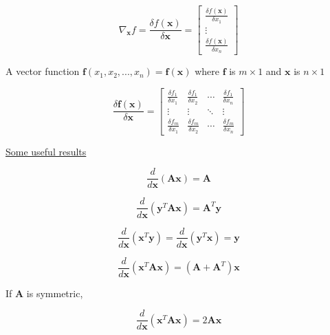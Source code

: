 \documentclass[fleqn]{article}
\begin{document}
	\begin{equation*}
		\nabla_{\mathbf{x}}f = \frac{\delta f(\mathbf{x})}{\delta\mathbf{x}} = \begin{bmatrix}
			\frac{\delta f(\mathbf{x})}{\delta{x_1}} \\
			\vdots \\
			\frac{\delta f(\mathbf{x})}{\delta{x_n}}
		\end{bmatrix}
	\end{equation*}
	
	A vector function $\mathbf{f}(x_1,x_2,...,x_n) = \mathbf{f}(\mathbf{x})$ where $\mathbf{f}$ is $m \times 1$ and $\mathbf{x}$ is $n \times 1$
	
	\begin{equation*}
		\frac{\delta\mathbf{f}(\mathbf{x})}{\delta\mathbf{x}} = \begin{bmatrix}
			\frac{\delta{f_1}}{\delta{x_1}} & \frac{\delta{f_1}}{\delta{x_2}} & \cdots & \frac{\delta{f_1}}{\delta{x_n}} \\
			\vdots & \vdots & \ddots & \vdots \\
			\frac{\delta{f_m}}{\delta{x_1}} & \frac{\delta{f_m}}{\delta{x_2}} & \cdots & \frac{\delta{f_m}}{\delta{x_n}}
		\end{bmatrix}
	\end{equation*}
	
	\underline{Some useful results}
	
	\begin{equation*}
		\frac{d}{d\mathbf{x}}(\mathbf{Ax}) = \mathbf{A}
	\end{equation*}
	
	\begin{equation*}
		\frac{d}{d\mathbf{x}}(\mathbf{y}^T\mathbf{Ax}) = \mathbf{A}^T\mathbf{y}
	\end{equation*}
	
	\begin{equation*}
		\frac{d}{d\mathbf{x}}(\mathbf{x}^T\mathbf{y}) = \frac{d}{d\mathbf{x}}(\mathbf{y}^T\mathbf{x}) = \mathbf{y}
	\end{equation*}
	
	\begin{equation*}
		\frac{d}{d\mathbf{x}}(\mathbf{x}^T\mathbf{Ax}) = (\mathbf{A} + \mathbf{A}^T)\mathbf{x}
	\end{equation*}
	
	If $\mathbf{A}$ is symmetric,
	
	\begin{equation*}
		\frac{d}{d\mathbf{x}}(\mathbf{x}^T\mathbf{Ax}) = 2\mathbf{Ax}
	\end{equation*}
	
\end{document}

